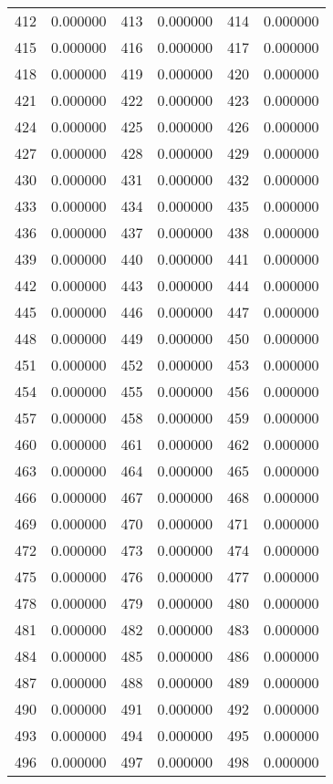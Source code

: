 \documentclass[12pt]{article}
\begin{document}
\begin{longtable}{@{}cc|cc|cc@{}}
412 & 0.000000 & 413 & 0.000000 & 414 & 0.000000 \\
415 & 0.000000 & 416 & 0.000000 & 417 & 0.000000 \\
418 & 0.000000 & 419 & 0.000000 & 420 & 0.000000 \\
421 & 0.000000 & 422 & 0.000000 & 423 & 0.000000 \\
424 & 0.000000 & 425 & 0.000000 & 426 & 0.000000 \\
427 & 0.000000 & 428 & 0.000000 & 429 & 0.000000 \\
430 & 0.000000 & 431 & 0.000000 & 432 & 0.000000 \\
433 & 0.000000 & 434 & 0.000000 & 435 & 0.000000 \\
436 & 0.000000 & 437 & 0.000000 & 438 & 0.000000 \\
439 & 0.000000 & 440 & 0.000000 & 441 & 0.000000 \\
442 & 0.000000 & 443 & 0.000000 & 444 & 0.000000 \\
445 & 0.000000 & 446 & 0.000000 & 447 & 0.000000 \\
448 & 0.000000 & 449 & 0.000000 & 450 & 0.000000 \\
451 & 0.000000 & 452 & 0.000000 & 453 & 0.000000 \\
454 & 0.000000 & 455 & 0.000000 & 456 & 0.000000 \\
457 & 0.000000 & 458 & 0.000000 & 459 & 0.000000 \\
460 & 0.000000 & 461 & 0.000000 & 462 & 0.000000 \\
463 & 0.000000 & 464 & 0.000000 & 465 & 0.000000 \\
466 & 0.000000 & 467 & 0.000000 & 468 & 0.000000 \\
469 & 0.000000 & 470 & 0.000000 & 471 & 0.000000 \\
472 & 0.000000 & 473 & 0.000000 & 474 & 0.000000 \\
475 & 0.000000 & 476 & 0.000000 & 477 & 0.000000 \\
478 & 0.000000 & 479 & 0.000000 & 480 & 0.000000 \\
481 & 0.000000 & 482 & 0.000000 & 483 & 0.000000 \\
484 & 0.000000 & 485 & 0.000000 & 486 & 0.000000 \\
487 & 0.000000 & 488 & 0.000000 & 489 & 0.000000 \\
490 & 0.000000 & 491 & 0.000000 & 492 & 0.000000 \\
493 & 0.000000 & 494 & 0.000000 & 495 & 0.000000 \\
496 & 0.000000 & 497 & 0.000000 & 498 & 0.000000 \\

\end{longtable}
\end{document}
